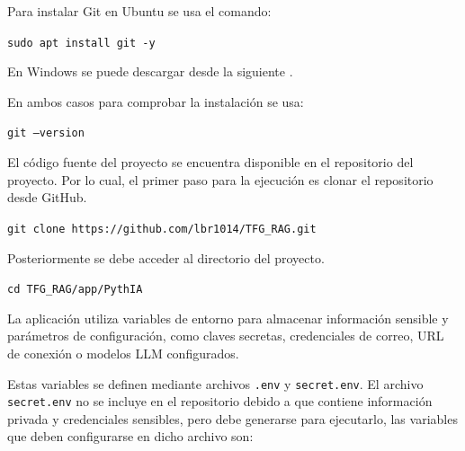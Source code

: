 Para instalar Git en Ubuntu se usa el comando:

\begin{tcolorbox}[
	colback=black!3,
	colframe=black!30,
	boxrule=0.5pt,
	arc=2mm,
	title= Terminal,
	fonttitle=\bfseries,
	breakable
]
	{\footnotesize
		\noindent
		\texttt{sudo apt install git -y}
	}
\end{tcolorbox}

En Windows se puede descargar desde la siguiente .

En ambos casos para comprobar la instalación se usa:

\begin{tcolorbox}[
	colback=black!3,
	colframe=black!30,
	boxrule=0.5pt,
	arc=2mm,
	title= Terminal,
	fonttitle=\bfseries,
	breakable
]
	{\footnotesize
		\noindent
		\texttt{git --version}
	}
\end{tcolorbox}

El código fuente del proyecto se encuentra disponible en el repositorio  del proyecto. Por lo cual, el primer paso para la ejecución es clonar el repositorio desde GitHub. 

\begin{tcolorbox}[
	colback=black!3,
	colframe=black!30,
	boxrule=0.5pt,
	arc=2mm,
	title= Terminal,
	fonttitle=\bfseries,
	breakable
]
	{\footnotesize
		\noindent
		\texttt{git clone https://github.com/lbr1014/TFG\_RAG.git}
	}
\end{tcolorbox}

Posteriormente se debe acceder al directorio del proyecto.

\begin{tcolorbox}[
	colback=black!3,
	colframe=black!30,
	boxrule=0.5pt,
	arc=2mm,
	title= Terminal,
	fonttitle=\bfseries,
	breakable
]
	{\footnotesize
		\noindent
		\texttt{cd TFG\_RAG/app/PythIA}
	}
\end{tcolorbox}

La aplicación utiliza variables de entorno para almacenar información sensible y parámetros de configuración, como claves secretas, credenciales de correo, URL de conexión o modelos LLM configurados.

Estas variables se definen mediante archivos \texttt{.env} y \texttt{secret.env}. El archivo \texttt{secret.env} no se incluye en el repositorio debido a que contiene información privada y credenciales sensibles, pero debe generarse para ejecutarlo, las variables que deben configurarse en dicho archivo son:

